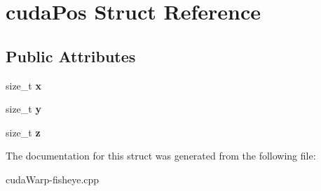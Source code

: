 \hypertarget{structcudaPos}{}\section{cuda\+Pos Struct Reference}
\label{structcudaPos}
\subsection*{Public Attributes}
\begin{DoxyCompactItemize}
\item 
size\+\_\+t {\bfseries x}\hypertarget{structcudaPos_aee81d58a0ea213f0136b9f25cbfade0d}{}\label{structcudaPos_aee81d58a0ea213f0136b9f25cbfade0d}

\item 
size\+\_\+t {\bfseries y}\hypertarget{structcudaPos_a211bae4c3bc936237f34237d04d98088}{}\label{structcudaPos_a211bae4c3bc936237f34237d04d98088}

\item 
size\+\_\+t {\bfseries z}\hypertarget{structcudaPos_a42abb5eb62901902e70965a2ddf860b0}{}\label{structcudaPos_a42abb5eb62901902e70965a2ddf860b0}

\end{DoxyCompactItemize}


The documentation for this struct was generated from the following file\+:\begin{DoxyCompactItemize}
\item 
cuda\+Warp-\/fisheye.\+cpp\end{DoxyCompactItemize}
